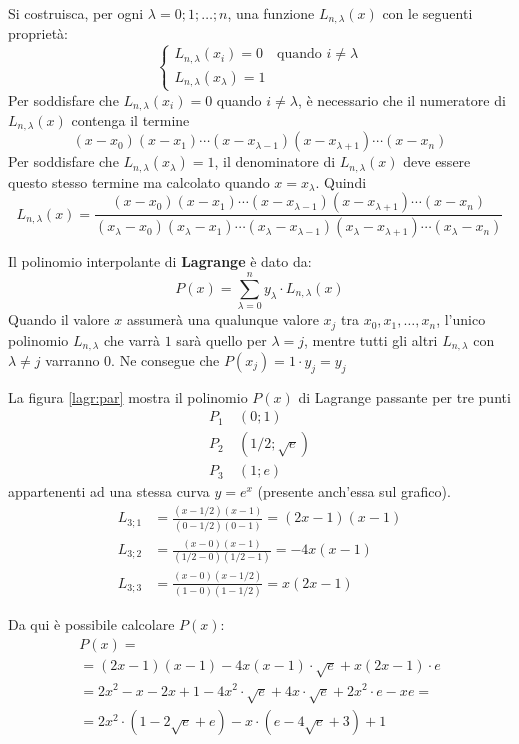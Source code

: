 Si costruisca, per ogni $\lambda=0;1;\dots; n$, una funzione $L_{n,\lambda}(x)$ con le seguenti proprietà:
\[
\begin{cases}
L_{n,\lambda}(x_i)=0\quad \text{quando }i\neq\lambda\\
L_{n,\lambda}(x_\lambda)=1
\end{cases}
\]
Per soddisfare che $L_{n,\lambda}(x_i)=0$ quando $i\neq\lambda$, è necessario che il numeratore di $L_{n,\lambda}(x)$ contenga il termine
\[
(x-x_0)(x-x_1)\cdots(x-x_{\lambda-1})(x-x_{\lambda+1})\cdots(x-x_n)
\]
Per soddisfare che $L_{n,\lambda}(x_\lambda)=1$, il denominatore di $L_{n,\lambda}(x)$ deve essere questo stesso termine ma calcolato quando $x=x_\lambda$. Quindi
\begin{equation}
L_{n,\lambda}(x)=\frac{(x-x_0)(x-x_1)\cdots(x-x_{\lambda-1})(x-x_{\lambda+1})\cdots(x-x_n)}{(x_\lambda-x_0)(x_\lambda-x_1)\cdots(x_\lambda-x_{\lambda-1})(x_\lambda-x_{\lambda+1})\cdots(x_\lambda-x_n)}
\end{equation}

Il polinomio interpolante di \textbf{Lagrange} è dato da:
\begin{equation}
P(x)=\sum_{\lambda=0}^n y_\lambda\cdot L_{n,\lambda}(x)
\end{equation}
Quando il valore $x$ assumerà una qualunque valore $x_j$ tra $x_0, x_1,\dots,x_n$, l'unico polinomio $L_{n,\lambda}$ che varrà $1$ sarà quello per $\lambda=j$, mentre tutti gli altri $L_{n, \lambda}$ con $\lambda\neq j$ varranno $0$. Ne consegue che $P(x_j)=1\cdot y_j=y_j$

La figura \ref{lagr:par} mostra il polinomio $P(x)$ di Lagrange passante per tre punti
\begin{align*}
P_1&\:(0;1)\\
P_2&\:(1/2; \sqrt{e})\\
P_3&\:(1;e)
\end{align*}
appartenenti ad una stessa curva $y=e^x$ (presente anch'essa sul grafico).
\begin{align*}
L_{3; 1}&=\frac{(x-1/2)(x-1)}{(0-1/2)(0-1)}=(2x-1)(x-1)\\
L_{3; 2}&=\frac{(x-0)(x-1)}{(1/2-0)(1/2-1)}=-4x(x-1)\\
L_{3; 3}&=\frac{(x-0)(x-1/2)}{(1-0)(1-1/2)}=x(2x-1)
\end{align*}

Da qui è possibile calcolare $P(x)$:
\begin{multline*}
P(x)=\\
=(2x-1)(x-1)-4x(x-1)\cdot \sqrt{e}+x(2x-1)\cdot e\\
=2x^2-x-2x+1-4x^2\cdot\sqrt{e} +4x\cdot\sqrt{e}+2x^2\cdot e-xe=\\
=2x^2\cdot(1-2\sqrt{e}+e)-x\cdot(e-4\sqrt{e}+3)+1
\end{multline*}

